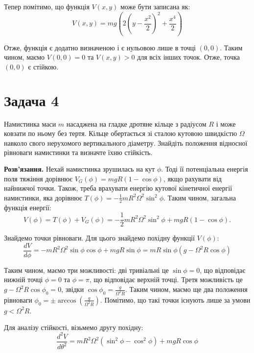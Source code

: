 \documentclass{hw_template}
\begin{document}
Тепер помітимо, що функція $V(x,y)$ може бути записана як:
\begin{equation*}
    V(x,y) = mg\left(2\left(y-\frac{x^2}{2}\right)^2 + \frac{x^4}{2}\right)
\end{equation*}

Отже, функція є додатно визначеною і є нульовою лише в точці $(0,0)$. Таким чином,
маємо $V(0,0)=0$ та $V(x,y) > 0$ для всіх інших точок. Отже, точка $(0,0)$ є
стійкою.

\section{Задача 4}

\begin{problem}
    Намистинка маси $m$ насаджена на гладке дротяне кільце з радіусом $R$ і може
ковзати по ньому без тертя. Кільце обертається зі сталою кутовою швидкістю $\Omega$
навколо свого нерухомого вертикального діаметру. Знайдіть положення відносної
рівноваги намистинки та визначте їхню стійкість.
\end{problem}

\textbf{Розв'язання.} Нехай намистинка зрушилась на кут $\phi$. Тоді її
потенціальна енергія поля тяжіння дорівнює $V_G(\phi) = mgR(1-\cos\phi)$, якщо
рахувати від найнижчої точки. Також, треба врахувати енергію кутової кінетичної
енергії намистинки, яка дорівнює $T(\phi) = -\frac{1}{2}mR^2\Omega^2\sin^2\phi$.
Таким чином, загальна функція енергії:
\begin{equation*}
    V(\phi) = T(\phi) + V_G(\phi) = -\frac{1}{2}mR^2\Omega^2\sin^2\phi + mgR(1-\cos\phi).
\end{equation*}

Знайдемо точки рівноваги. Для цього знайдемо похідну функції $V(\phi)$:
\begin{equation*}
    \frac{dV}{d\phi} = -mR^2\Omega^2\sin\phi\cos\phi + mgR\sin\phi = mR \sin\phi(g - \Omega^2 R \cos\phi)
\end{equation*}

Таким чином, маємо три можливості: дві тривіальні це $\sin\phi = 0$, що
відповідає нижній точці $\phi=0$ та $\phi=\pi$, що відповідає верхній точці.
Третя можливість це $g - \Omega^2 R \cos\phi_0 = 0$, звідки $\cos\phi_0 =
\frac{g}{\Omega^2 R}$. Таким чином, маємо ще два положення рівноваги $\phi_0 =
\pm\arccos\left(\frac{g}{\Omega^2 R}\right)$. Помітимо, що такі точки існують 
лише за умови $g < \Omega^2 R$.

Для аналізу стійкості, візьмемо другу похідну:
\begin{equation*}
    \frac{d^2V}{d\theta^2} = mR^2\Omega^2(\sin^2\phi - \cos^2\phi) + mgR \cos \phi
\end{equation*}
\end{document}
